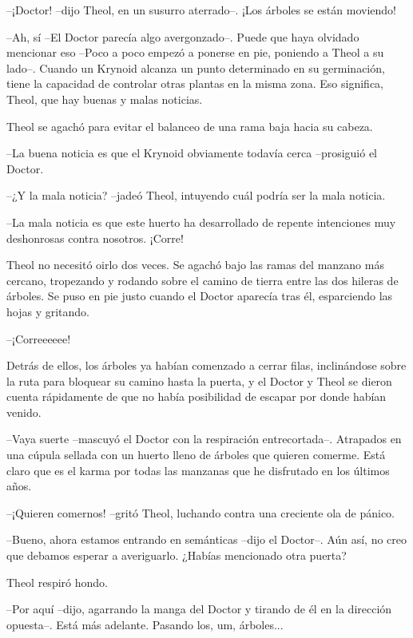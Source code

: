 --¡Doctor! --dijo Theol, en un susurro aterrado--. ¡Los árboles se están moviendo!



--Ah, sí --El Doctor parecía algo avergonzado--. Puede que haya olvidado mencionar eso --Poco a poco empezó a ponerse en pie, poniendo a Theol a su lado--. Cuando un Krynoid alcanza un punto determinado en su germinación, tiene la capacidad de controlar otras plantas en la misma zona. Eso significa, Theol, que hay buenas y malas noticias.



Theol se agachó para evitar el balanceo de una rama baja hacia su cabeza.



--La buena noticia es que el Krynoid obviamente todavía cerca --prosiguió el Doctor.



--¿Y la mala noticia? --jadeó Theol, intuyendo cuál podría ser la mala noticia.



--La mala noticia es que este huerto ha desarrollado de repente intenciones muy deshonrosas contra nosotros. ¡Corre!



Theol no necesitó oirlo dos veces. Se agachó bajo las ramas del manzano más cercano, tropezando y rodando sobre el camino de tierra entre las dos hileras de árboles. Se puso en pie justo cuando el Doctor aparecía tras él, esparciendo las hojas y gritando.

--¡Correeeeee!



Detrás de ellos, los árboles ya habían comenzado a cerrar filas, inclinándose sobre la ruta para bloquear su camino hasta la puerta, y el Doctor y Theol se dieron cuenta rápidamente de que no había posibilidad de escapar por donde habían venido.



--Vaya suerte --mascuyó el Doctor con la respiración entrecortada--. Atrapados en una cúpula sellada con un huerto lleno de árboles que quieren comerme. Está claro que es el karma por todas las manzanas que he disfrutado en los últimos años.



--¡Quieren comernos! --gritó Theol, luchando contra una creciente ola de pánico.



--Bueno, ahora estamos entrando en semánticas --dijo el Doctor--. Aún así, no creo que debamos esperar a averiguarlo. ¿Habías mencionado otra puerta?



Theol respiró hondo.

--Por aquí --dijo, agarrando la manga del Doctor y tirando de él en la dirección opuesta--. Está más adelante. Pasando los, um, árboles...
